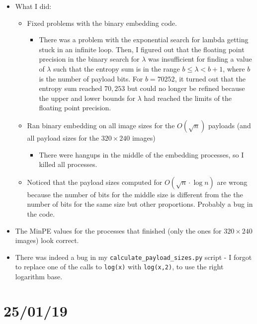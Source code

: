 \documentclass[11pt,a4paper]{report}
\begin{document}
\begin{itemize}

  \item What I did:
    \begin{itemize}
      \item Fixed problems with the binary embedding code.
        \begin{itemize}
          \item There was a problem with the exponential search for lambda getting stuck in an infinite loop. Then, I figured out that the floating point precision in the binary search for $\lambda$ was insufficient for finding a value of $\lambda$ such that the entropy sum is in the range $b \leq \lambda < b+1$, where $b$ is the number of payload bits. For $b = 70252$, it turned out that the entropy sum reached $70,253$ but could no longer be refined because the upper and lower bounds for $\lambda$ had reached the limits of the floating point precision.
        \end{itemize}
      \item Ran binary embedding on all image sizes for the $O(\sqrt{n})$ payloads (and all payload sizes for the $320\times240$ images)
        \begin{itemize}
          \item There were hangups in the middle of the embedding processes, so I killed all processes.
        \end{itemize}
      \item Noticed that the payload sizes computed for $O(\sqrt{n}\cdot\log{n})$ are wrong because the number of bits for the middle size is different from the the number of bits for the same size but other proportions. Probably a bug in the code.
    \end{itemize}

  \item The MinPE values for the processes that finished (only the ones for $320\times240$ images) look correct.
  
  \item There was indeed a bug in my \texttt{calculate\_payload\_sizes.py} script - I forgot to replace one of the calls to \texttt{log(x)} with \texttt{log(x,2)}, to use the right logarithm base.

\end{itemize}

\section{25/01/19}
\end{document}
